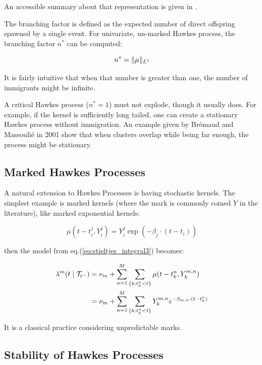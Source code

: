 \documentclass[11pt]{book}
\begin{document}
An accessible summary about that representation is given in \cite{socialhawkes}. 

\begin{definition}
The branching factor is defined as the expected number of direct offspring spawned by a single event. For univariate, un-marked Hawkes process, the branching factor $n^*$ can be computed:

$$ n^* = \lVert  \mu \rVert_{L^1} $$

It is fairly intuitive that when that number is greater than one, the number of immigrants might be infinite. 
\end{definition}


\begin{remarque}
A critical Hawkes process ($n^* = 1$) must not explode, though it usually does. For example, if the kernel is sufficiently long tailed, one can create a stationary Hawkes process without immigration. An example given by Brémaud and Massoulié in 2001 show that when clusters overlap while being far enough, the process might be stationary.
\end{remarque}







\subsection{Marked Hawkes Processes}
\label{subsection:marked}
A natural extension to Hawkes Processes is having stochastic kernels. The simplest example is marked kernels (where the mark is commonly coined $Y$ in the literature), like marked exponential kernels:

$$\mu(t- t_i^j, Y_i^j) =  Y_i^j \exp \left ( - \beta_j \cdot ( t - t_i ) \right ) $$

then the model from eq.(\ref{eq:stieltjes_integral3}) becomes:

\begin{align}
\lambda^m (t \mid \mathcal{T}_{t^-} ) &= \nu_m + \sum_{n = 1}^M \sum_{ \{k: t_k^n < t \}} \mu(t- t_k^{n}, Y_k^{m,n}) \notag \\
&=  \nu_m + \sum_{n = 1}^M \sum_{ \{k: t_k^n < t \}}   Y_k^{m,n} e^{- \beta_{m,n} \cdot ( t - t_k^n ) } 
\end{align}

It is a classical practice considering unpredictable marks. 



\subsection{Stability of Hawkes Processes}
\end{document}
